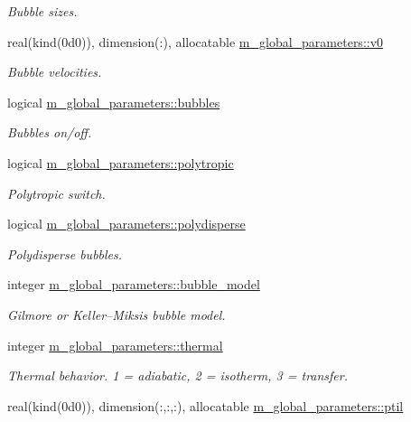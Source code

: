 \begin{Indent}
\begin{DoxyCompactItemize}
\begin{DoxyCompactList}\small\item\em Bubble sizes. \end{DoxyCompactList}\item 
real(kind(0d0)), dimension(\+:), allocatable \hyperlink{namespacem__global__parameters_a334b440356a4353d073c43e68c2372da}{m\+\_\+global\+\_\+parameters\+::v0}
\begin{DoxyCompactList}\small\item\em Bubble velocities. \end{DoxyCompactList}\item 
logical \hyperlink{namespacem__global__parameters_a4a22ed160838f8fbe6bd506f334b8815}{m\+\_\+global\+\_\+parameters\+::bubbles}
\begin{DoxyCompactList}\small\item\em Bubbles on/off. \end{DoxyCompactList}\item 
logical \hyperlink{namespacem__global__parameters_a8d670f2f984167bae71b7b3f12d0908a}{m\+\_\+global\+\_\+parameters\+::polytropic}
\begin{DoxyCompactList}\small\item\em Polytropic switch. \end{DoxyCompactList}\item 
logical \hyperlink{namespacem__global__parameters_a32791d9d5fef0213f01fc31713b17ae8}{m\+\_\+global\+\_\+parameters\+::polydisperse}
\begin{DoxyCompactList}\small\item\em Polydisperse bubbles. \end{DoxyCompactList}\item 
integer \hyperlink{namespacem__global__parameters_aef0de5da0e41de495e9fe67accd62d77}{m\+\_\+global\+\_\+parameters\+::bubble\+\_\+model}
\begin{DoxyCompactList}\small\item\em Gilmore or Keller--Miksis bubble model. \end{DoxyCompactList}\item 
integer \hyperlink{namespacem__global__parameters_a17169a5387f8f1efd5ac34cb4eae7c81}{m\+\_\+global\+\_\+parameters\+::thermal}
\begin{DoxyCompactList}\small\item\em Thermal behavior. 1 = adiabatic, 2 = isotherm, 3 = transfer. \end{DoxyCompactList}\item 
real(kind(0d0)), dimension(\+:,\+:,\+:), allocatable \hyperlink{namespacem__global__parameters_ac6ff480000eaa7af51481d0f17b78423}{m\+\_\+global\+\_\+parameters\+::ptil}

\end{DoxyCompactItemize}
\end{Indent}
